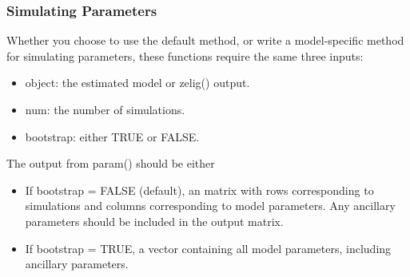 \documentclass[letterpaper,10pt,english]{sphinxmanual}
\begin{document}
\subsubsection{Simulating Parameters}
\label{9_adding_models_and_methods:simulating-parameters}
Whether you choose to use the default method, or write a model-specific
method for simulating parameters, these functions require the same three
inputs:
\begin{itemize}
\item {} 
object: the estimated model or zelig() output.

\item {} 
num: the number of simulations.

\item {} 
bootstrap: either TRUE or FALSE.

\end{itemize}

The output from param() should be either
\begin{itemize}
\item {} 
If bootstrap = FALSE (default), an matrix with rows corresponding to
simulations and columns corresponding to model parameters. Any
ancillary parameters should be included in the output matrix.

\item {} 
If bootstrap = TRUE, a vector containing all model parameters,
including ancillary parameters.

\end{itemize}
\end{document}
